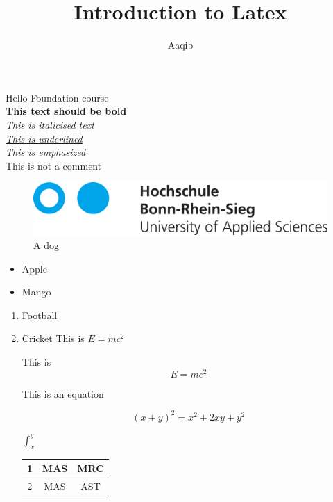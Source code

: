 \documentclass{article}
\title{Introduction to Latex}
\author{Aaqib}
\begin{document}
    \maketitle
    \newpage

    Hello Foundation course\\
    \textbf{This text should be bold}\\
    \textit{This is italicised text}\\

    \textit{\underline{This is underlined}}\\
    \textit{This is \emph{emphasized}}\\

    This is not a comment%

    \begin{center}
        \begin{figure}[h]
        \caption{A dog}
        \includegraphics[scale=0.2]{hbrs_logo.png}
        \end{figure}
    \end{center}

    \begin{itemize}
        \item Apple
        \item Mango
    \end{itemize}

    \begin{enumerate}
        \item Football
        \item Cricket
    \newpage
    This is $E =mc^2$

    This is $$E =mc^2$$

    This is an equation

    \begin{equation}
        (x+y)^2 = x^2 + 2xy + y^2
    \end{equation}

    $\int _x ^y$

    \begin{tabular}{|c| c |c|}
        \hline
        1 & MAS & MRC \\
        \hline
        2 & MAS & AST\\
        \hline
    \end{tabular}

    \end{enumerate}
\end{document}
